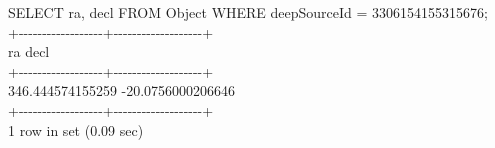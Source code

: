 SELECT ra, decl FROM Object WHERE deepSourceId = 3306154155315676;\\
+-\/-\/-\/-\/-\/-\/-\/-\/-\/-\/-\/-\/-\/-\/-\/-\/-\/-+-\/-\/-\/-\/-\/-\/-\/-\/-\/-\/-\/-\/-\/-\/-\/-\/-\/-\/-+\\
\textbar{} ra \textbar{} decl \textbar{}\\
+-\/-\/-\/-\/-\/-\/-\/-\/-\/-\/-\/-\/-\/-\/-\/-\/-\/-+-\/-\/-\/-\/-\/-\/-\/-\/-\/-\/-\/-\/-\/-\/-\/-\/-\/-\/-+\\
\textbar{} 346.444574155259 \textbar{} -20.0756000206646 \textbar{}\\
+-\/-\/-\/-\/-\/-\/-\/-\/-\/-\/-\/-\/-\/-\/-\/-\/-\/-+-\/-\/-\/-\/-\/-\/-\/-\/-\/-\/-\/-\/-\/-\/-\/-\/-\/-\/-+\\
1 row in set (0.09 sec)

~


